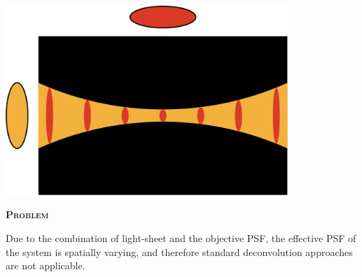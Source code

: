\documentclass[a0paper,portrait,fontscale=0.35]{baposter}
\newcommand{\mycaption}[1]{
  {
    \smaller
    \emph{#1}
  }
}
\theoremstyle{plain}
\theoremstyle{plain}
\theoremstyle{definition}
\theoremstyle{plain}
\theoremstyle{definition}
\begin{document}
\begin{poster}
{\begin{minipage}[t]{\textwidth}
\begin{minipage}[t]{0.48\textwidth}
      \begin{minipage}[t]{\textwidth}
        \centering
        \includegraphics[width=0.8\textwidth]{img/psf_4.png}

      \end{minipage}

      \begin{center}
        \larger
        {\color{red}\textbf{\textsc{Problem}}}\\
      \end{center}
      \vspace{-0.5em}
      \begin{tcolorbox}[colback=red!10!white,colframe=red]
        Due to the combination of light-sheet and the objective PSF, 
        the effective PSF of the system is spatially varying, and
        therefore standard deconvolution approaches are not applicable.
      \end{tcolorbox}

    \end{minipage}
  \end{minipage}
}
\end{poster}
\end{document}
